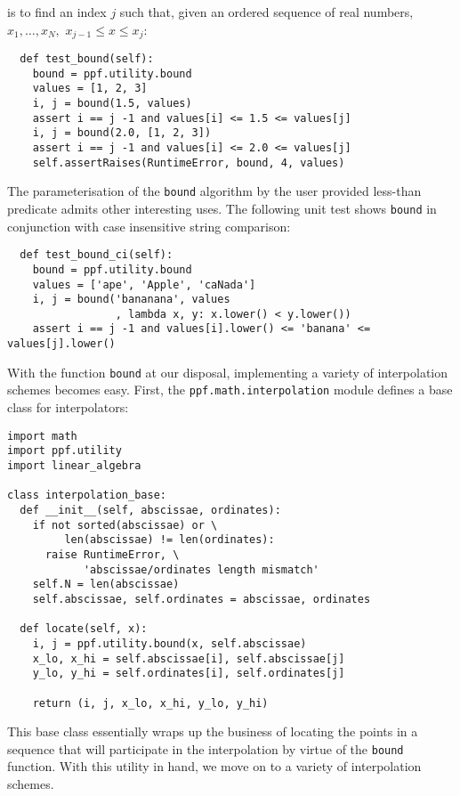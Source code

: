 is to find an index $j$ such that, given an ordered sequence of real numbers, 
$x_{1}, \ldots, x_{N}, $ $x_{j-1} \le x \le x_{j}$:
\begin{verbatim}
  def test_bound(self):
    bound = ppf.utility.bound
    values = [1, 2, 3]
    i, j = bound(1.5, values)
    assert i == j -1 and values[i] <= 1.5 <= values[j]
    i, j = bound(2.0, [1, 2, 3])
    assert i == j -1 and values[i] <= 2.0 <= values[j]
    self.assertRaises(RuntimeError, bound, 4, values)
\end{verbatim}
The parameterisation of the \verb|bound| algorithm by the user provided less-than
predicate admits other interesting uses. The following unit test shows \verb|bound|
in conjunction with case insensitive string comparison:
\begin{verbatim}
  def test_bound_ci(self):
    bound = ppf.utility.bound
    values = ['ape', 'Apple', 'caNada']
    i, j = bound('bananana', values
                 , lambda x, y: x.lower() < y.lower())
    assert i == j -1 and values[i].lower() <= 'banana' <= values[j].lower()
\end{verbatim}
With the function \verb|bound| at our disposal, implementing a variety of interpolation
schemes becomes easy. First, the \verb|ppf.math.interpolation| module defines a base
class for interpolators:
\begin{verbatim}
import math
import ppf.utility
import linear_algebra

class interpolation_base:
  def __init__(self, abscissae, ordinates):
    if not sorted(abscissae) or \
         len(abscissae) != len(ordinates):
      raise RuntimeError, \
            'abscissae/ordinates length mismatch'
    self.N = len(abscissae)
    self.abscissae, self.ordinates = abscissae, ordinates

  def locate(self, x):
    i, j = ppf.utility.bound(x, self.abscissae)
    x_lo, x_hi = self.abscissae[i], self.abscissae[j]
    y_lo, y_hi = self.ordinates[i], self.ordinates[j]

    return (i, j, x_lo, x_hi, y_lo, y_hi)
\end{verbatim}
This base class essentially wraps up the business of locating the
points in a sequence that will participate in the interpolation by 
virtue of the \verb|bound| function. With this utility in hand,
we move on to a variety of interpolation schemes.

